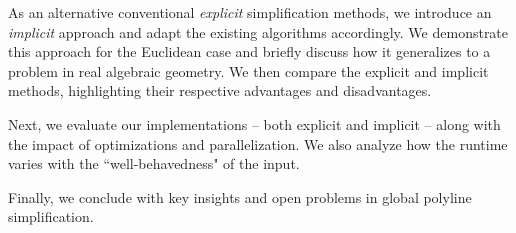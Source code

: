 As an alternative conventional \emph{explicit} simplification methods, we introduce an \emph{implicit} approach and adapt the existing algorithms accordingly. We demonstrate this approach for the Euclidean case and briefly discuss how it generalizes to a problem in real algebraic geometry. We then compare the explicit and implicit methods, highlighting their respective advantages and disadvantages. 

Next, we evaluate our implementations -- both explicit and implicit -- along with the impact of optimizations and parallelization. We also analyze how the runtime varies with the ``well-behavedness" of the input. 

Finally, we conclude with key insights and open problems in global polyline simplification. 

